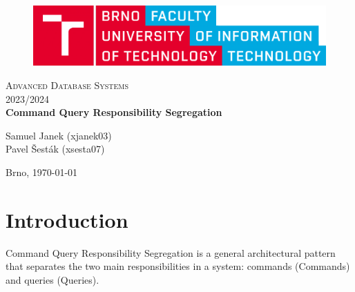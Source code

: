 \documentclass[12pt,english]{article}
\author{Pavel Šesták, Samuel Janek}
\date{03.10.2023}
\begin{document}
  \begin{titlepage}
		\begin{center}

			\begin{figure}
				\center\includegraphics[scale=0.3]{images/logo.png}
			\end{figure}

			\vspace{3cm}

			\textsc{\LARGE Advanced Database Systems } \\[0.5cm]
			\textsc{\LARGE 2023/2024} \\[3.5cm]

			\textbf{\LARGE Command Query Responsibility Segregation} \\[1cm]
			\vspace{3cm}
		    \vspace{3cm}
		    
		    {\Large Samuel Janek (xjanek03)} \\[0.5cm]
		    {\Large Pavel Šesták (xsesta07)} \\[0.5cm]
		    
			
			\vspace{3cm}
                
		    \textsc{}{\LARGE Brno, \today}

		\end{center}
	\end{titlepage}

\begin{center}
	\tableofcontents %
	\listoffigures
    \listoftables
	\clearpage %
\end{center}


  
 
\section{Introduction}
 Command Query Responsibility Segregation is a general architectural pattern that separates the two main responsibilities in a system: commands (Commands) and queries (Queries).
\end{document}
